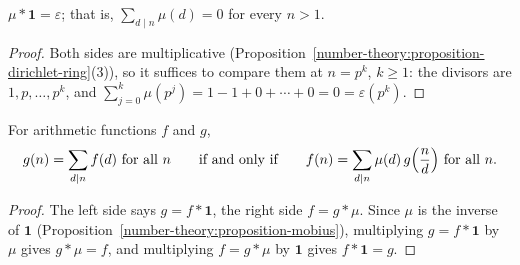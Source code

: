 \begin{proposition}\label{number-theory:proposition-mobius}
$\mu * \mathbf{1} = \varepsilon$; that is, $\sum_{d \mid n}\mu(d) = 0$ for every $n > 1$.
\end{proposition}

\begin{proof}
Both sides are multiplicative (Proposition~\ref{number-theory:proposition-dirichlet-ring}(3)), so it suffices to compare them at $n = p^k$, $k \geq 1$: the divisors are $1, p, \ldots, p^k$, and
$\sum_{j=0}^{k}\mu(p^j) = 1 - 1 + 0 + \cdots + 0 = 0 = \varepsilon(p^k)$.
\end{proof}

\begin{theorem}\label{number-theory:theorem-mobius-inversion}
For arithmetic functions $f$ and $g$,
\[
g(n) = \sum_{d \mid n}f(d) \ \text{for all } n \qquad\text{if and only if}\qquad f(n) = \sum_{d \mid n}\mu(d)\,g\Bigl(\frac{n}{d}\Bigr) \ \text{for all } n .
\]
\end{theorem}

\begin{proof}
The left side says $g = f * \mathbf{1}$, the right side $f = g * \mu$. Since $\mu$ is the inverse of $\mathbf{1}$ (Proposition~\ref{number-theory:proposition-mobius}), multiplying $g = f * \mathbf{1}$ by $\mu$
gives $g * \mu = f$, and multiplying $f = g * \mu$ by $\mathbf{1}$ gives $f * \mathbf{1} = g$.
\end{proof}

